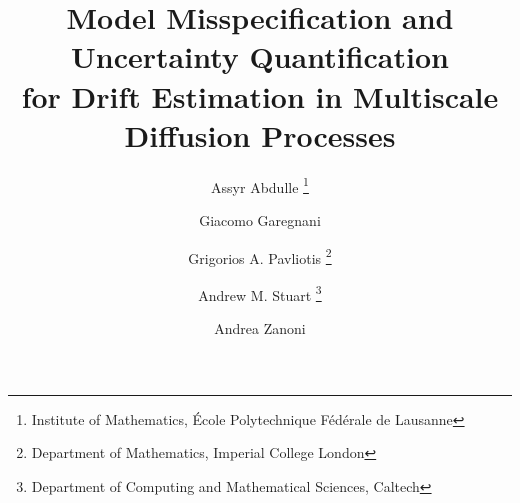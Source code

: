 \newcommand*\samethanks[1][\value{footnote}]{\footnotemark[#1]}

\newcommand{\email}[1]{\href{#1}{#1}}
\newcommand{\TheTitle}{Model Misspecification and Uncertainty Quantification \\ for Drift Estimation in Multiscale Diffusion Processes} 
\newcommand{\TheAuthors}{A. Abdulle, G. Garegnani, G. Pavliotis, A. M. Stuart}
\title{\TheTitle}
\author{Assyr Abdulle \thanks{Institute of Mathematics, École Polytechnique Fédérale de Lausanne}
		\and Giacomo Garegnani  \samethanks
		\and Grigorios A. Pavliotis \thanks{Department of Mathematics, Imperial College London}
		\and Andrew M. Stuart \thanks{Department of Computing and Mathematical Sciences, Caltech}
		\and Andrea Zanoni \samethanks[1]
}
\date{}

\usepackage{amsopn}
\DeclareMathOperator{\diag}{diag}
\DeclarePairedDelimiter{\ceil}{\left\lceil}{\right\rceil}
\DeclarePairedDelimiter{\floor}{\lfloor}{\rfloor}
\newcommand{\abs}[1]{\left\lvert#1\right\rvert}
\newcommand{\norm}[1]{\left\|#1\right\|}
\renewcommand{\phi}{\varphi}
\renewcommand{\theta}{\vartheta}
\renewcommand{\Pr}{\mathbb{P}}
\newcommand{\btilde}{\widetilde}
\newcommand{\bhat}{\widehat}
\newcommand{\eqtext}[1]{\ensuremath{\stackrel{#1}{=}}}
\newcommand{\leqtext}[1]{\ensuremath{\stackrel{#1}{\leq}}}
\newcommand{\iid}{\ensuremath{\stackrel{\text{i.i.d.}}{\sim}}}
\newcommand{\totext}[1]{\ensuremath{\stackrel{#1}{\to}}}
\newcommand{\rightarrowtext}[1]{\ensuremath{\stackrel{#1}{\longrightarrow}}}
\newcommand{\leftrightarrowtext}[1]{\ensuremath{\stackrel{#1}{\longleftrightarrow}}}
\newcommand{\pdv}[2]{\ensuremath\partial_{#2}#1}
\newcommand{\N}{\mathbb{N}}
\newcommand{\R}{\mathbb{R}}
\newcommand{\C}{\mathbb{C}}
\newcommand{\OO}{\mathcal{O}}
\newcommand{\epl}{\varepsilon}
\newcommand{\diffL}{\mathcal{L}}
\newcommand{\defeq}{\coloneqq}
\newcommand{\eqdef}{\eqqcolon}
\newcommand{\Var}{\operatorname{Var}}
\newcommand{\E}{\operatorname{\mathbb{E}}}
\newcommand{\PP}{\operatorname{\mathbb{P}}}
\newcommand{\MSE}{\operatorname{MSE}}
\newcommand{\trace}{\operatorname{tr}}
\newcommand{\MH}{\mathrm{MH}}
\newcommand{\ttt}{\texttt}
\newcommand{\Hell}{d_{\mathrm{Hell}}}
\newcommand{\sksum}{{\textstyle\sum}}
\renewcommand{\d}{\mathrm{d}}
\newcommand{\dd}{\,\mathrm{d}}
\newcommand{\corr}[1]{{\color{red}#1}}
\newcommand{\Tau}{\tau}
\newcommand{\LL}{L}
\newcommand{\HH}{H}
\newcommand{\WW}{W}
\newcommand{\mbf}{\mathbf}
\newcommand{\bfs}{\boldsymbol}
\newcommand{\todo}{{\color{red} TO DO}}
\newcommand{\X}{\mathbb{X}}
\newcommand{\nablar}{\nabla_{\hat x}}
\newcommand{\eval}[1]{\bigr\rvert_{#1}}
\newcommand{\normm}[1]{\norm{#1}_a}
\newcommand{\gausspdf}[3]{\exp\left\{-\frac{(#1 - #2)^2}{#3}\right\}}

